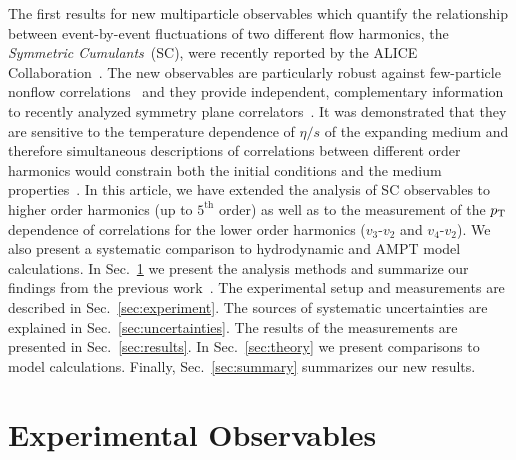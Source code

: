 The first results for new multiparticle observables which quantify the relationship between event-by-event fluctuations of two different flow harmonics, the \textit{Symmetric Cumulants}~(SC), were recently reported by the ALICE Collaboration~\cite{ALICE:2016kpq}.
The new observables are particularly robust against few-particle nonflow correlations~\cite{Aamodt:2010pa} and they provide independent, complementary information to recently analyzed symmetry plane correlators~\cite{Aad:2014fla}. 
It was demonstrated that they are sensitive to the temperature dependence of $\eta/s$ of the expanding medium and therefore simultaneous descriptions of correlations between different order harmonics would constrain both the initial conditions and the medium properties~\cite{ALICE:2016kpq,Zhu:2016puf}.
In this article, we have extended the analysis of SC observables to higher order harmonics (up to $5^{\mathrm{th}}$ order) as well as to the measurement of the $p_{\rm T}$ dependence of correlations for the lower order harmonics ($v_3$-$v_2$ and $v_4$-$v_2$).  We also present a systematic comparison to hydrodynamic and AMPT model calculations.
In Sec.~\ref{sec:method} we present the analysis methods and summarize our findings from the previous work~\cite{ALICE:2016kpq}. The experimental setup and measurements are described in Sec.~\ref{sec:experiment}. The sources of systematic uncertainties are explained in Sec.~\ref{sec:uncertainties}. The results of the measurements are presented in Sec.~\ref{sec:results}. In Sec.~\ref{sec:theory} we present comparisons to model calculations.
Finally, Sec.~\ref{sec:summary} summarizes our new results.
 
\section{Experimental Observables}
\label{sec:method}


